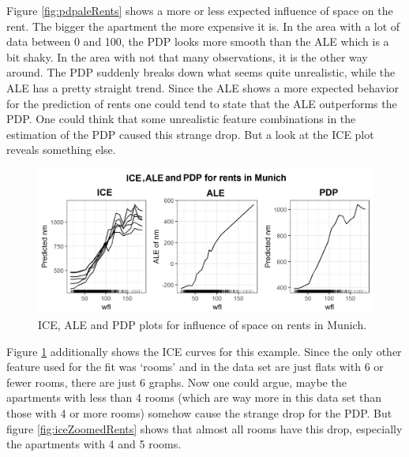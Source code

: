 \documentclass[]{krantz}
\begin{document}
Figure \ref{fig:pdpaleRents} shows a more or less expected influence of
space on the rent. The bigger the apartment the more expensive it is. In
the area with a lot of data between 0 and 100, the PDP looks more smooth
than the ALE which is a bit shaky. In the area with not that many
observations, it is the other way around. The PDP suddenly breaks down
what seems quite unrealistic, while the ALE has a pretty straight trend.
Since the ALE shows a more expected behavior for the prediction of rents
one could tend to state that the ALE outperforms the PDP. One could
think that some unrealistic feature combinations in the estimation of
the PDP caused this strange drop. But a look at the ICE plot reveals
something else.

\begin{figure}
\includegraphics[width=1\linewidth]{images/ale_1_rf_rent_for_rooms_and_wfl_ALE_vs_ICE} \caption{ICE, ALE and PDP plots for influence of space on
rents in Munich.}\label{fig:aleIceRents}
\end{figure}




Figure \ref{fig:aleIceRents} additionally shows the ICE curves for this
example. Since the only other feature used for the fit was `rooms' and
in the data set are just flats with 6 or fewer rooms, there are just 6
graphs. Now one could argue, maybe the apartments with less than 4 rooms
(which are way more in this data set than those with 4 or more rooms)
somehow cause the strange drop for the PDP. But figure
\ref{fig:iceZoomedRents} shows that almost all rooms have this drop,
especially the apartments with 4 and 5 rooms.
\end{document}
